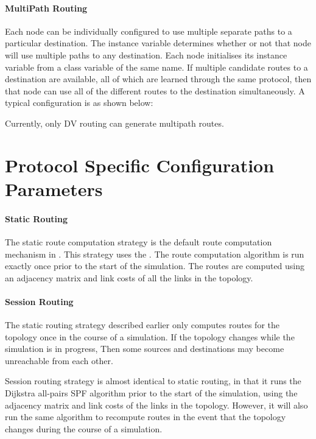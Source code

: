 \paragraph{MultiPath Routing}
Each node can be individually configured
to use multiple separate paths to a particular destination.
The instance variable  determines whether or not
that node will use multiple paths to any destination.
Each node initialises its instance variable from a class variable
of the same name.
If multiple candidate routes to a destination are available,
all of which are learned through the same protocol,
then that node can use
all of the different routes to the destination simultaneously.
A typical configuration is as shown below:
Currently, only DV routing can generate multipath routes.

\section{Protocol Specific Configuration Parameters}
\label{sec:uni:protconfig}

\paragraph{Static Routing}
The static route computation strategy is
the default route computation mechanism  in \ns.
This strategy uses the
.
The route computation algorithm is run exactly once
prior to the start of the simulation.
The routes are computed
using an adjacency matrix and link costs of all the links in the topology.

\paragraph{Session Routing}
The static routing strategy described earlier
only computes routes for the topology once in the course of a simulation.
If the topology changes while the simulation is in progress,
Then some sources and destinations may become unreachable from each other.

Session routing strategy is almost identical to static routing,
in that it runs the Dijkstra all-pairs SPF algorithm
prior to the start of the simulation, using the
adjacency matrix and link costs of the links in the topology.
However, it will also run the same algorithm to recompute routes
in the event that the topology changes during the course of a simulation.

